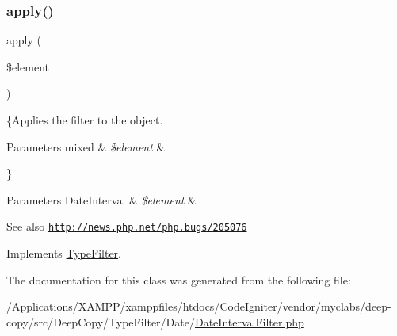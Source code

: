 \subsubsection{\texorpdfstring{apply()}{apply()}}
{\footnotesize\ttfamily apply (\begin{DoxyParamCaption}\item[{}]{\$element }\end{DoxyParamCaption})}

\{Applies the filter to the object.


\begin{DoxyParams}[1]{Parameters}
mixed & {\em \$element} & \\
\hline
\end{DoxyParams}
\}


\begin{DoxyParams}[1]{Parameters}
Date\+Interval & {\em \$element} & \\
\hline
\end{DoxyParams}
\begin{DoxySeeAlso}{See also}
\href{http://news.php.net/php.bugs/205076}{\tt http\+://news.\+php.\+net/php.\+bugs/205076} 
\end{DoxySeeAlso}


Implements \mbox{\hyperlink{interface_deep_copy_1_1_type_filter_1_1_type_filter_a959e75f8f2b305dcf33633745c338176}{Type\+Filter}}.



The documentation for this class was generated from the following file\+:\begin{DoxyCompactItemize}
\item 
/\+Applications/\+X\+A\+M\+P\+P/xamppfiles/htdocs/\+Code\+Igniter/vendor/myclabs/deep-\/copy/src/\+Deep\+Copy/\+Type\+Filter/\+Date/\mbox{\hyperlink{_date_interval_filter_8php}{Date\+Interval\+Filter.\+php}}\end{DoxyCompactItemize}
